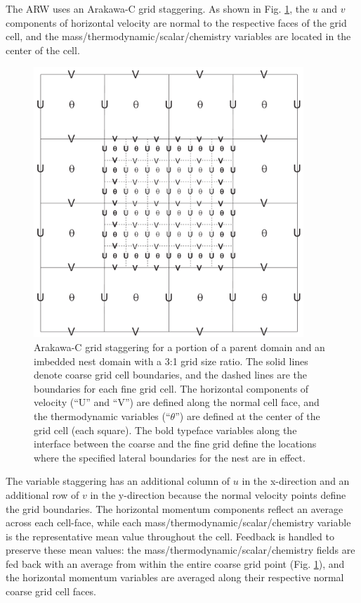The ARW uses an Arakawa-C grid staggering.  As shown in Fig.
\ref{figure:cg_fg}, the $u$ and $v$ components 
of horizontal velocity are normal to the respective faces of the 
grid cell, and the mass/thermodynamic/scalar/chemistry variables are located 
in the center of the cell.   

%
%
\begin{figure}
  \centering
  \includegraphics[width=4in]{figures/cg_fg.pdf}
  \caption{\label{figure:cg_fg}
Arakawa-C grid staggering for a portion of a parent domain and an
imbedded nest domain with a 3:1 grid size ratio.  The solid lines
denote coarse grid cell boundaries, and the dashed lines are the
boundaries for each fine grid cell.  The horizontal components of
velocity (``U'' and ``V'') are defined along the normal cell face, and
the thermodynamic variables (``$\theta$'') are defined at the center of
the grid cell (each square).  The bold typeface variables along the
interface between the coarse and the fine grid define the locations
where the specified lateral boundaries for the nest are in
effect.  } \end{figure}

The variable staggering has an additional column 
of $u$ in the x-direction and an additional row of $v$ in the y-direction
because the normal velocity points define the grid boundaries.
The horizontal momentum components reflect an average across each 
cell-face, while each mass/thermodynamic/scalar/chemistry variable
is the representative mean value throughout the cell.  
Feedback is handled to preserve these mean values: the mass/thermodynamic/scalar/chemistry
fields are fed back with an average from within the entire 
coarse grid point (Fig. \ref{figure:cg_fg}), and the horizontal momentum variables are
averaged along their respective normal coarse grid cell faces.

